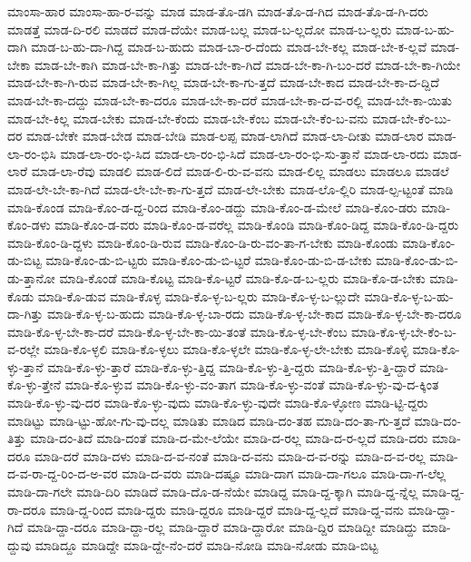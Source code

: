 {ಮಾಂಸಾ-ಹಾರ
ಮಾಂಸಾ-ಹಾ-ರ-ವನ್ನು
ಮಾಡ
ಮಾಡ-ತೊ-ಡಗಿ
ಮಾಡ-ತೊ-ಡ-ಗಿದ
ಮಾಡ-ತೊ-ಡ-ಗಿ-ದರು
ಮಾಡತ್ತೆ
ಮಾಡ-ದಿ-ರಲಿ
ಮಾಡದೆ
ಮಾಡ-ದೆಯೇ
ಮಾಡ-ಬಲ್ಲ
ಮಾಡ-ಬ-ಲ್ಲದೋ
ಮಾಡ-ಬ-ಲ್ಲರು
ಮಾಡ-ಬ-ಹು-ದಾಗಿ
ಮಾಡ-ಬ-ಹು-ದಾ-ಗಿದ್ದ
ಮಾಡ-ಬ-ಹುದು
ಮಾಡ-ಬಾ-ರ-ದೆಂದು
ಮಾಡ-ಬೇ-ಕಲ್ಲ
ಮಾಡ-ಬೇ-ಕ-ಲ್ಲವೆ
ಮಾಡ-ಬೇಕಾ
ಮಾಡ-ಬೇ-ಕಾಗಿ
ಮಾಡ-ಬೇ-ಕಾ-ಗಿತ್ತು
ಮಾಡ-ಬೇ-ಕಾ-ಗಿದೆ
ಮಾಡ-ಬೇ-ಕಾ-ಗಿ-ಬಂ-ದರೆ
ಮಾಡ-ಬೇ-ಕಾ-ಗಿಯೇ
ಮಾಡ-ಬೇ-ಕಾ-ಗಿ-ರುವ
ಮಾಡ-ಬೇ-ಕಾ-ಗಿಲ್ಲ
ಮಾಡ-ಬೇ-ಕಾ-ಗು-ತ್ತದೆ
ಮಾಡ-ಬೇ-ಕಾದ
ಮಾಡ-ಬೇ-ಕಾ-ದ-ದ್ದಿದೆ
ಮಾಡ-ಬೇ-ಕಾ-ದದ್ದು
ಮಾಡ-ಬೇ-ಕಾ-ದರೂ
ಮಾಡ-ಬೇ-ಕಾ-ದರೆ
ಮಾಡ-ಬೇ-ಕಾ-ದ-ವ-ರಲ್ಲಿ
ಮಾಡ-ಬೇ-ಕಾ-ಯಿತು
ಮಾಡ-ಬೇ-ಕಿಲ್ಲ
ಮಾಡ-ಬೇಕು
ಮಾಡ-ಬೇ-ಕೆಂದು
ಮಾಡ-ಬೇ-ಕೆಂಬ
ಮಾಡ-ಬೇ-ಕೆಂ-ಬ-ವನು
ಮಾಡ-ಬೇ-ಕೆಂ-ಬು-ದರ
ಮಾಡ-ಬೇಕೇ
ಮಾಡ-ಬೇಡ
ಮಾಡ-ಬೇಡಿ
ಮಾಡ-ಲಪ್ಪ
ಮಾಡ-ಲಾಗಿದೆ
ಮಾಡ-ಲಾ-ದೀತು
ಮಾಡ-ಲಾರ
ಮಾಡ-ಲಾ-ರಂ-ಭಿಸಿ
ಮಾಡ-ಲಾ-ರಂ-ಭಿ-ಸಿದ
ಮಾಡ-ಲಾ-ರಂ-ಭಿ-ಸಿದೆ
ಮಾಡ-ಲಾ-ರಂ-ಭಿ-ಸು-ತ್ತಾನೆ
ಮಾಡ-ಲಾ-ರದು
ಮಾಡ-ಲಾರೆ
ಮಾಡ-ಲಾ-ರೆವು
ಮಾಡಲಿ
ಮಾಡ-ಲಿದೆ
ಮಾಡ-ಲಿ-ರು-ವ-ವನು
ಮಾಡ-ಲಿಲ್ಲ
ಮಾಡಲು
ಮಾಡಲೂ
ಮಾಡಲೆ
ಮಾಡ-ಲೇ-ಬೇ-ಕಾ-ಗಿದೆ
ಮಾಡ-ಲೇ-ಬೇ-ಕಾ-ಗು-ತ್ತದೆ
ಮಾಡ-ಲೇ-ಬೇಕು
ಮಾಡ-ಲೊ-ಲ್ಲಿರಿ
ಮಾಡ-ಲ್ಪ-ಟ್ಟಂತೆ
ಮಾಡಿ
ಮಾಡಿ-ಕೊಂಡ
ಮಾಡಿ-ಕೊಂ-ಡ-ದ್ದ-ರಿಂದ
ಮಾಡಿ-ಕೊಂ-ಡದ್ದು
ಮಾಡಿ-ಕೊಂ-ಡ-ಮೇಲೆ
ಮಾಡಿ-ಕೊಂ-ಡರು
ಮಾಡಿ-ಕೊಂ-ಡಳು
ಮಾಡಿ-ಕೊಂ-ಡ-ವರು
ಮಾಡಿ-ಕೊಂ-ಡ-ವರೆಲ್ಲ
ಮಾಡಿ-ಕೊಂಡಿ
ಮಾಡಿ-ಕೊಂ-ಡಿದ್ದ
ಮಾಡಿ-ಕೊಂ-ಡಿ-ದ್ದರು
ಮಾಡಿ-ಕೊಂ-ಡಿ-ದ್ದಳು
ಮಾಡಿ-ಕೊಂ-ಡಿ-ರುವ
ಮಾಡಿ-ಕೊಂ-ಡಿ-ರು-ವಂ-ತಾ-ಗ-ಬೇಕು
ಮಾಡಿ-ಕೊಂಡು
ಮಾಡಿ-ಕೊಂ-ಡು-ಬಿಟ್ಟ
ಮಾಡಿ-ಕೊಂ-ಡು-ಬಿ-ಟ್ಟರು
ಮಾಡಿ-ಕೊಂ-ಡು-ಬಿ-ಟ್ಟರೆ
ಮಾಡಿ-ಕೊಂ-ಡು-ಬಿ-ಡ-ಬೇಕು
ಮಾಡಿ-ಕೊಂ-ಡು-ಬಿ-ಡು-ತ್ತಾನೋ
ಮಾಡಿ-ಕೊಂಡೆ
ಮಾಡಿ-ಕೊಟ್ಟ
ಮಾಡಿ-ಕೊ-ಟ್ಟರೆ
ಮಾಡಿ-ಕೊ-ಡ-ಬ-ಲ್ಲರು
ಮಾಡಿ-ಕೊ-ಡ-ಬೇಕು
ಮಾಡಿ-ಕೊಡು
ಮಾಡಿ-ಕೊ-ಡುವ
ಮಾಡಿ-ಕೊಳ್ಳ
ಮಾಡಿ-ಕೊ-ಳ್ಳ-ಬ-ಲ್ಲರು
ಮಾಡಿ-ಕೊ-ಳ್ಳ-ಬ-ಲ್ಲುದೇ
ಮಾಡಿ-ಕೊ-ಳ್ಳ-ಬ-ಹು-ದಾ-ಗಿತ್ತು
ಮಾಡಿ-ಕೊ-ಳ್ಳ-ಬ-ಹುದು
ಮಾಡಿ-ಕೊ-ಳ್ಳ-ಬಾ-ರದು
ಮಾಡಿ-ಕೊ-ಳ್ಳ-ಬೇ-ಕಾದ
ಮಾಡಿ-ಕೊ-ಳ್ಳ-ಬೇ-ಕಾ-ದರೂ
ಮಾಡಿ-ಕೊ-ಳ್ಳ-ಬೇ-ಕಾ-ದರೆ
ಮಾಡಿ-ಕೊ-ಳ್ಳ-ಬೇ-ಕಾ-ಯಿ-ತಂತೆ
ಮಾಡಿ-ಕೊ-ಳ್ಳ-ಬೇ-ಕೆಂಬ
ಮಾಡಿ-ಕೊ-ಳ್ಳ-ಬೇ-ಕೆಂ-ಬ-ವ-ರಲ್ಲೇ
ಮಾಡಿ-ಕೊ-ಳ್ಳಲಿ
ಮಾಡಿ-ಕೊ-ಳ್ಳಲು
ಮಾಡಿ-ಕೊ-ಳ್ಳಲೇ
ಮಾಡಿ-ಕೊ-ಳ್ಳ-ಲೇ-ಬೇಕು
ಮಾಡಿ-ಕೊಳ್ಳಿ
ಮಾಡಿ-ಕೊ-ಳ್ಳು-ತ್ತಾನೆ
ಮಾಡಿ-ಕೊ-ಳ್ಳು-ತ್ತಾರೆ
ಮಾಡಿ-ಕೊ-ಳ್ಳು-ತ್ತಿದ್ದ
ಮಾಡಿ-ಕೊ-ಳ್ಳು-ತ್ತಿ-ದ್ದರು
ಮಾಡಿ-ಕೊ-ಳ್ಳು-ತ್ತಿ-ದ್ದಾರೆ
ಮಾಡಿ-ಕೊ-ಳ್ಳು-ತ್ತೇನೆ
ಮಾಡಿ-ಕೊ-ಳ್ಳುವ
ಮಾಡಿ-ಕೊ-ಳ್ಳು-ವಂ-ತಾಗ
ಮಾಡಿ-ಕೊ-ಳ್ಳು-ವಂತೆ
ಮಾಡಿ-ಕೊ-ಳ್ಳು-ವು-ದ-ಕ್ಕಿಂತ
ಮಾಡಿ-ಕೊ-ಳ್ಳು-ವು-ದರ
ಮಾಡಿ-ಕೊ-ಳ್ಳು-ವುದು
ಮಾಡಿ-ಕೊ-ಳ್ಳು-ವುದೇ
ಮಾಡಿ-ಕೊ-ಳ್ಳೋಣ
ಮಾಡಿ-ಟ್ಟಿ-ದ್ದರು
ಮಾಡಿಟ್ಟು
ಮಾಡಿ-ಟ್ಟು-ಹೋ-ಗು-ವು-ದಲ್ಲ
ಮಾಡಿತು
ಮಾಡಿದ
ಮಾಡಿ-ದಂ-ತಹ
ಮಾಡಿ-ದಂ-ತಾ-ಗು-ತ್ತದೆ
ಮಾಡಿ-ದಂ-ತಿತ್ತು
ಮಾಡಿ-ದಂ-ತಿದೆ
ಮಾಡಿ-ದಂತೆ
ಮಾಡಿ-ದ-ಮೇ-ಲೆಯೇ
ಮಾಡಿ-ದ-ರಲ್ಲ
ಮಾಡಿ-ದ-ರ-ಲ್ಲದೆ
ಮಾಡಿ-ದರು
ಮಾಡಿ-ದರೂ
ಮಾಡಿ-ದರೆ
ಮಾಡಿ-ದಳು
ಮಾಡಿ-ದ-ವ-ನಂತೆ
ಮಾಡಿ-ದ-ವನು
ಮಾಡಿ-ದ-ವ-ರನ್ನು
ಮಾಡಿ-ದ-ವ-ರಲ್ಲ
ಮಾಡಿ-ದ-ವ-ರಾ-ದ್ದ-ರಿಂ-ದ-ಅ-ವರ
ಮಾಡಿ-ದ-ವರು
ಮಾಡಿ-ದಷ್ಟೂ
ಮಾಡಿ-ದಾಗ
ಮಾಡಿ-ದಾ-ಗಲೂ
ಮಾಡಿ-ದಾ-ಗ-ಲೆಲ್ಲ
ಮಾಡಿ-ದಾ-ಗಲೇ
ಮಾಡಿ-ದಿರಿ
ಮಾಡಿದೆ
ಮಾಡಿ-ದೊ-ಡ-ನೆಯೇ
ಮಾಡಿದ್ದ
ಮಾಡಿ-ದ್ದ-ಕ್ಕಾಗಿ
ಮಾಡಿ-ದ್ದ-ನ್ನೆಲ್ಲ
ಮಾಡಿ-ದ್ದ-ರಾ-ದರೂ
ಮಾಡಿ-ದ್ದ-ರಿಂದ
ಮಾಡಿ-ದ್ದರು
ಮಾಡಿ-ದ್ದರೂ
ಮಾಡಿ-ದ್ದರೆ
ಮಾಡಿ-ದ್ದ-ಲ್ಲದೆ
ಮಾಡಿ-ದ್ದ-ವನು
ಮಾಡಿ-ದ್ದಾ-ಗಿದೆ
ಮಾಡಿ-ದ್ದಾ-ದರೂ
ಮಾಡಿ-ದ್ದಾ-ರಲ್ಲ
ಮಾಡಿ-ದ್ದಾರೆ
ಮಾಡಿ-ದ್ದಾರೋ
ಮಾಡಿ-ದ್ದಿರ
ಮಾಡಿದ್ದೀ
ಮಾಡಿದ್ದು
ಮಾಡಿ-ದ್ದುವು
ಮಾಡಿದ್ದೂ
ಮಾಡಿದ್ದೇ
ಮಾಡಿ-ದ್ದೇ-ನೆಂ-ದರೆ
ಮಾಡಿ-ನೋಡಿ
ಮಾಡಿ-ನೋಡು
ಮಾಡಿ-ಬಿಟ್ಟ
}

